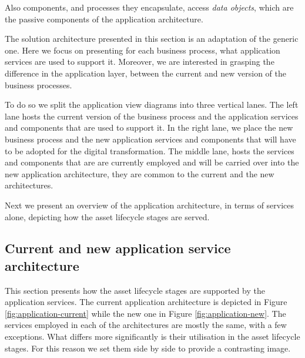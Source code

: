 	Also components, and processes they encapsulate, access \textit{data objects}, which are the passive components of the application architecture.

	The solution architecture presented in this section is an adaptation of the generic one. Here we focus on presenting for each business process, what application services are used to support it. Moreover, we are interested in grasping the difference in the application layer, between the current and new version of the business processes. 
	
	To do so we split the application view diagrams into three vertical lanes. The left lane hosts the current version of the business process and the application services and components that are used to support it. In the right lane, we place the new business process and the new application services and components that will have to be adopted for the digital transformation. The middle lane, hosts the services and components that are are currently employed and will be carried over into the new application architecture, they are common to the current and the new architectures.

	Next we present an overview of the application architecture, in terms of services alone, depicting how the asset lifecycle stages are served.
	
	\subsection{Current and new application service architecture}
	\label{sec:application-overview}
	
	This section presents how the asset lifecycle stages are supported by the application services. The current application architecture is depicted in Figure \ref{fig:application-current} while the new one in Figure \ref{fig:application-new}. The services employed in each of the architectures are mostly the same, with a few exceptions. What differs more significantly is their utilisation in the asset lifecycle stages. For this reason we set them side by side to provide a contrasting image. 
	
